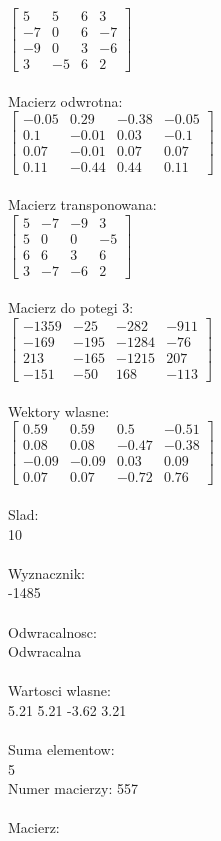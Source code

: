 \documentclass[a4paper,12pt]{article}
\begin{document}
$\begin{bmatrix} 5&5&6&3\\-7&0&6&-7\\-9&0&3&-6\\3&-5&6&2 \end{bmatrix}$
\\
\\
Macierz odwrotna:\\

$\begin{bmatrix} -0.05&0.29&-0.38&-0.05\\0.1&-0.01&0.03&-0.1\\0.07&-0.01&0.07&0.07\\0.11&-0.44&0.44&0.11 \end{bmatrix}$
\\
\\
Macierz transponowana:\\

$\begin{bmatrix} 5&-7&-9&3\\5&0&0&-5\\6&6&3&6\\3&-7&-6&2 \end{bmatrix}$
\\
\\
Macierz do potegi 3:\\

$\begin{bmatrix} -1359&-25&-282&-911\\-169&-195&-1284&-76\\213&-165&-1215&207\\-151&-50&168&-113 \end{bmatrix}$
\\
\\
Wektory wlasne:\\

$\begin{bmatrix} 0.59&0.59&0.5&-0.51\\0.08&0.08&-0.47&-0.38\\-0.09&-0.09&0.03&0.09\\0.07&0.07&-0.72&0.76 \end{bmatrix}$
\\
\\
Slad:\\
10
\\
\\
Wyznacznik:\\
-1485
\\
\\
Odwracalnosc:\\
Odwracalna
\\
\\
Wartosci wlasne:\\
5.21 5.21 -3.62 3.21
\\
\\
Suma elementow:\\
5
\\
\newpage
Numer macierzy:
557
\\
\\
Macierz:\\
\end{document}
